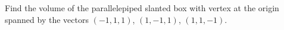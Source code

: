 \begin{frame}
Find the volume of the parallelepiped slanted box with vertex at the origin spanned by the vectors $(-1,1,1)$, $(1,-1,1)$, $(1,1,-1)$.
\end{frame}